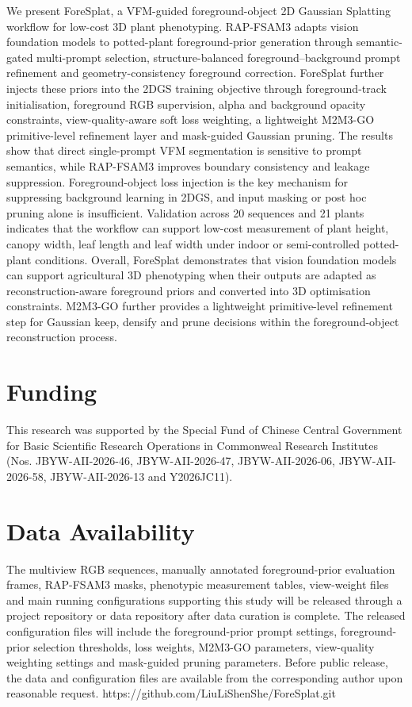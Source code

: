 \documentclass[a4paper]{cas-sc}
\begin{document}
We present ForeSplat, a VFM-guided foreground-object 2D Gaussian Splatting workflow for low-cost 3D plant phenotyping. RAP-FSAM3 adapts vision foundation models to potted-plant foreground-prior generation through semantic-gated multi-prompt selection, structure-balanced foreground--background prompt refinement and geometry-consistency foreground correction. ForeSplat further injects these priors into the 2DGS training objective through foreground-track initialisation, foreground RGB supervision, alpha and background opacity constraints, view-quality-aware soft loss weighting, a lightweight M2M3-GO primitive-level refinement layer and mask-guided Gaussian pruning. The results show that direct single-prompt VFM segmentation is sensitive to prompt semantics, while RAP-FSAM3 improves boundary consistency and leakage suppression. Foreground-object loss injection is the key mechanism for suppressing background learning in 2DGS, and input masking or post hoc pruning alone is insufficient. Validation across 20 sequences and 21 plants indicates that the workflow can support low-cost measurement of plant height, canopy width, leaf length and leaf width under indoor or semi-controlled potted-plant conditions. Overall, ForeSplat demonstrates that vision foundation models can support agricultural 3D phenotyping when their outputs are adapted as reconstruction-aware foreground priors and converted into 3D optimisation constraints. M2M3-GO further provides a lightweight primitive-level refinement step for Gaussian keep, densify and prune decisions within the foreground-object reconstruction process.

\section*{Funding}

This research was supported by the Special Fund of Chinese Central Government for Basic Scientific Research Operations in Commonweal Research Institutes (Nos. JBYW-AII-2026-46, JBYW-AII-2026-47, JBYW-AII-2026-06, JBYW-AII-2026-58, JBYW-AII-2026-13 and Y2026JC11).

\section*{Data Availability}

The multiview RGB sequences, manually annotated foreground-prior evaluation frames, RAP-FSAM3 masks, phenotypic measurement tables, view-weight files and main running configurations supporting this study will be released through a project repository or data repository after data curation is complete. The released configuration files will include the foreground-prior prompt settings, foreground-prior selection thresholds, loss weights, M2M3-GO parameters, view-quality weighting settings and mask-guided pruning parameters. Before public release, the data and configuration files are available from the corresponding author upon reasonable request.
https://github.com/LiuLiShenShe/ForeSplat.git
\end{document}
